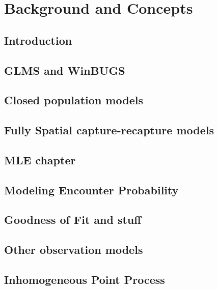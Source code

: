 \documentclass{book}
\begin{document}
\part{Background and Concepts}


\chapter{Introduction}
\label{chapt.intro}

\chapter{GLMS and WinBUGS}
\label{chapt.glms}

\chapter{Closed population models}
\label{chapt.closed}

\chapter{Fully Spatial capture-recapture models}
\label{chapt.scr0}

\chapter{MLE chapter}
\label{chapt.mle}

\chapter{Modeling Encounter Probability}
\label{chapt.covariates}

\chapter{Goodness of Fit and stuff}
\label{chapt.gof}

\chapter{Other observation models}
\label{chapt.poisson-mn}




\chapter{Inhomogeneous Point Process}
\label{chapt.state-space}
\end{document}
